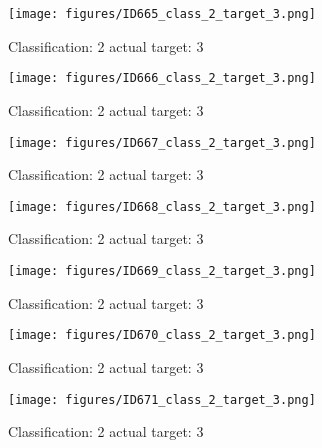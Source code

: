 \begin{figure}[h!]
\begin{center}
\texttt{[image: figures/ID665\_class\_2\_target\_3.png]}
\end{center}
\caption{ Classification: 2 actual target: 3}
\label{fig:ID665_class_2_target_3}
\end{figure}
\begin{figure}[h!]
\begin{center}
\texttt{[image: figures/ID666\_class\_2\_target\_3.png]}
\end{center}
\caption{ Classification: 2 actual target: 3}
\label{fig:ID666_class_2_target_3}
\end{figure}
\begin{figure}[h!]
\begin{center}
\texttt{[image: figures/ID667\_class\_2\_target\_3.png]}
\end{center}
\caption{ Classification: 2 actual target: 3}
\label{fig:ID667_class_2_target_3}
\end{figure}
\begin{figure}[h!]
\begin{center}
\texttt{[image: figures/ID668\_class\_2\_target\_3.png]}
\end{center}
\caption{ Classification: 2 actual target: 3}
\label{fig:ID668_class_2_target_3}
\end{figure}
\begin{figure}[h!]
\begin{center}
\texttt{[image: figures/ID669\_class\_2\_target\_3.png]}
\end{center}
\caption{ Classification: 2 actual target: 3}
\label{fig:ID669_class_2_target_3}
\end{figure}
\begin{figure}[h!]
\begin{center}
\texttt{[image: figures/ID670\_class\_2\_target\_3.png]}
\end{center}
\caption{ Classification: 2 actual target: 3}
\label{fig:ID670_class_2_target_3}
\end{figure}
\begin{figure}[h!]
\begin{center}
\texttt{[image: figures/ID671\_class\_2\_target\_3.png]}
\end{center}
\caption{ Classification: 2 actual target: 3}
\label{fig:ID671_class_2_target_3}
\end{figure}
